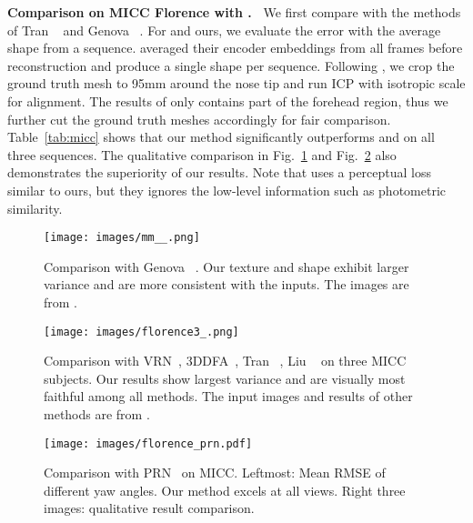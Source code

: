\documentclass[10pt,twocolumn,letterpaper]{article}
\begin{document}
\noindent\textbf{Comparison on MICC Florence with \cite{tran2017regressing,genova2018unsupervised,feng2018joint,jackson2017large,zhu2016face,liu2018disentangling}.~}
We first compare with the methods of Tran \etal~\cite{tran2017regressing} and Genova \etal~\cite{genova2018unsupervised}.
For \cite{tran2017regressing} and ours, we evaluate the error with the average shape from a sequence. \cite{genova2018unsupervised} averaged their encoder embeddings from all frames before reconstruction and produce a single shape per sequence. Following \cite{genova2018unsupervised}, we crop the ground truth mesh to 95mm around the nose tip and run ICP with isotropic scale for alignment. The results of \cite{tran2017regressing} only contains part of the forehead region, thus we further cut the ground truth meshes accordingly for fair comparison. Table~\ref{tab:micc} shows that our method significantly outperforms \cite{tran2017regressing} and \cite{genova2018unsupervised} on all three sequences. The qualitative comparison in Fig.~\ref{quality_unmm} and Fig.~\ref{fig:micc} also demonstrates the superiority of our results. Note that \cite{genova2018unsupervised} uses a perceptual loss similar to ours, but they ignores the low-level information such as photometric similarity. 

\begin{figure}[t]
	\texttt{[image: images/mm\_\_.png]}
	\caption{Comparison with Genova \etal~\cite{genova2018unsupervised}. Our texture and shape exhibit larger variance and are more consistent with the inputs. The images are from \cite{genova2018unsupervised}.}\label{quality_unmm}
\end{figure}
\begin{figure}[t]
	\texttt{[image: images/florence3\_.png]}
	\caption{Comparison with VRN~\cite{jackson2017large}, 3DDFA~\cite{zhu2016face}, Tran \etal~\cite{tran2017regressing}, Liu \etal~\cite{liu2018disentangling} on three MICC subjects. Our results show largest variance and are visually most faithful among all methods. The input images and results of other methods are from \cite{liu2018disentangling}.}\label{fig:micc}
\end{figure}

\begin{figure}[t]
	\centering
	\texttt{[image: images/florence\_prn.pdf]}
	\caption{Comparison with PRN~\cite{feng2018joint} on MICC. Leftmost: Mean RMSE of different yaw angles. Our method excels at all views. Right three images: qualitative result comparison.}\label{fig:prn}
	\vspace{-2pt}
\end{figure}
\end{document}
